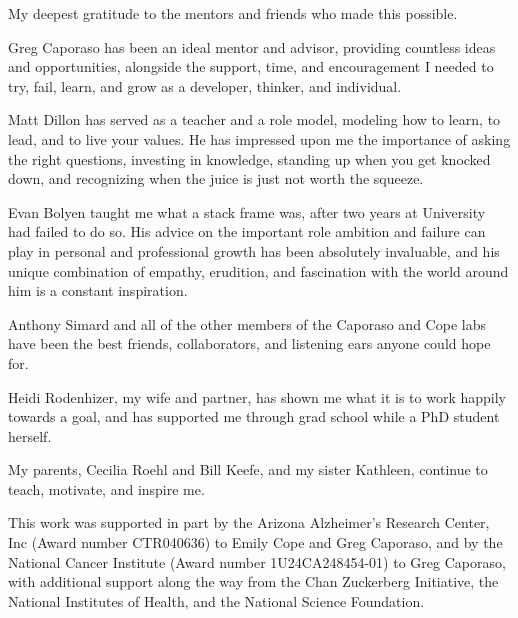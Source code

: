 My deepest gratitude to the mentors and friends who made this possible.

Greg Caporaso has been an ideal mentor and advisor, providing countless ideas
and opportunities, alongside the support, time, and encouragement I needed to
try, fail, learn, and grow as a developer, thinker, and individual.

Matt Dillon has served as a teacher and a role model, modeling how to learn,
to lead, and to live your values. He has impressed upon me the importance of
asking the right questions, investing in knowledge, standing up when you get
knocked down, and recognizing when the juice is just not worth the squeeze.

Evan Bolyen taught me what a stack frame was, after two years at University had
failed to do so. His advice on the important role ambition and failure can play
in personal and professional growth has been absolutely invaluable, and 
his unique combination of empathy, erudition, and fascination with the world
around him is a constant inspiration.

Anthony Simard and all of the other members of the Caporaso and Cope labs have
been the best friends, collaborators, and listening ears anyone could hope for.

Heidi Rodenhizer, my wife and partner, has shown me what it is to work happily
towards a goal, and has supported me through grad school while a PhD student
herself.

My parents, Cecilia Roehl and Bill Keefe, and my sister Kathleen, continue to
teach, motivate, and inspire me.

This work was supported in part by the Arizona Alzheimer’s Research Center, Inc
(Award number CTR040636) to Emily Cope and Greg Caporaso, and by the National
Cancer Institute (Award number 1U24CA248454-01) to Greg Caporaso, with
additional support along the way from the Chan Zuckerberg Initiative, the
National Institutes of Health, and the National Science Foundation.